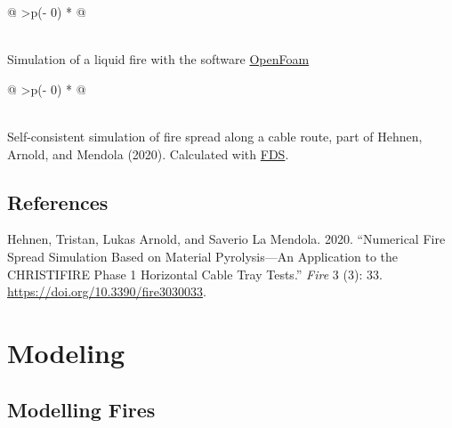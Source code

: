 \documentclass[
  letterpaper,
  DIV=11,
  numbers=noendperiod]{scrreprt}
\newlength{\cslhangindent}
\newenvironment{CSLReferences}[2] %
 {\begin{list}{}{%
  \setlength{\itemindent}{0pt}
  \setlength{\leftmargin}{0pt}
  \setlength{\parsep}{0pt}
  \ifodd #1
   \setlength{\leftmargin}{\cslhangindent}
   \setlength{\itemindent}{-1\cslhangindent}
  \fi
  \setlength{\itemsep}{#2\baselineskip}}}
 {\end{list}}
\begin{document}
\begin{longtable}[]{@{}
  >{\centering\arraybackslash}p{(\columnwidth - 0\tabcolsep) * }@{}}
\toprule\noalign{}
\begin{minipage}[b]{\linewidth}\centering
\end{minipage} \\
\midrule\noalign{}
\endhead
\bottomrule\noalign{}
\endlastfoot
Simulation of a liquid fire with the software
\href{https://www.openfoam.com/}{OpenFoam} \\
\end{longtable}

\begin{longtable}[]{@{}
  >{\centering\arraybackslash}p{(\columnwidth - 0\tabcolsep) * }@{}}
\toprule\noalign{}
\begin{minipage}[b]{\linewidth}\centering
\end{minipage} \\
\midrule\noalign{}
\endhead
\bottomrule\noalign{}
\endlastfoot
Self-consistent simulation of fire spread along a cable route, part of
Hehnen, Arnold, and Mendola (2020). Calculated with
\href{https://pages.nist.gov/fds-smv/}{FDS}. \\
\end{longtable}

\chapter*{References}\label{references}


\label{refs}
\begin{CSLReferences}{1}{0}
Hehnen, Tristan, Lukas Arnold, and Saverio La Mendola. 2020.
{``{Numerical Fire Spread Simulation Based on Material Pyrolysis---An
Application to the CHRISTIFIRE Phase 1 Horizontal Cable Tray Tests}.''}
\emph{Fire} 3 (3): 33. \url{https://doi.org/10.3390/fire3030033}.

\end{CSLReferences}

\part{Modeling}

\chapter{Modelling Fires}\label{modelling-fires}
\end{document}
